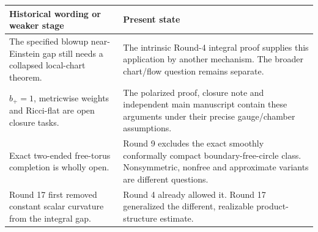 \documentclass[
  10pt,
]{article}
\begin{document}
\begin{longtable}[]{@{}>{\raggedright\arraybackslash}p{\dimexpr(\linewidth-2\tabcolsep)/2\relax}>{\raggedright\arraybackslash}p{\dimexpr(\linewidth-2\tabcolsep)/2\relax}@{}}
\toprule
\begin{minipage}[b]{0.47\columnwidth}\raggedright
Historical wording or weaker stage\strut
\end{minipage} & \begin{minipage}[b]{0.47\columnwidth}\raggedright
Present state\strut
\end{minipage}\tabularnewline
\midrule
\endhead
\begin{minipage}[t]{0.47\columnwidth}\raggedright
The specified blowup near-Einstein gap still needs a collapsed
local-chart theorem.\strut
\end{minipage} & \begin{minipage}[t]{0.47\columnwidth}\raggedright
The intrinsic Round-4 integral proof supplies this application by
another mechanism. The broader chart/flow question remains
separate.\strut
\end{minipage}\tabularnewline
\begin{minipage}[t]{0.47\columnwidth}\raggedright
\(b_+=1\), metricwise weights and Ricci-flat are open closure
tasks.\strut
\end{minipage} & \begin{minipage}[t]{0.47\columnwidth}\raggedright
The polarized proof, closure note and independent main manuscript
contain these arguments under their precise gauge/chamber
assumptions.\strut
\end{minipage}\tabularnewline
\begin{minipage}[t]{0.47\columnwidth}\raggedright
Exact two-ended free-torus completion is wholly open.\strut
\end{minipage} & \begin{minipage}[t]{0.47\columnwidth}\raggedright
Round 9 excludes the exact smoothly conformally compact
boundary-free-circle class. Nonsymmetric, nonfree and approximate
variants are different questions.\strut
\end{minipage}\tabularnewline
\begin{minipage}[t]{0.47\columnwidth}\raggedright
Round 17 first removed constant scalar curvature from the integral
gap.\strut
\end{minipage} & \begin{minipage}[t]{0.47\columnwidth}\raggedright
Round 4 already allowed it. Round 17 generalized the different,
realizable product-structure estimate.\strut

\end{minipage}
\end{longtable}
\end{document}
